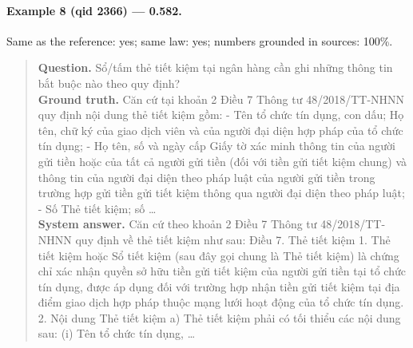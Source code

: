 \paragraph{Example 8 (qid 2366) --- \rl{} 0.582.} Same \dieu{} as the reference: yes; same law: yes; numbers grounded in sources: 100\%.
\begin{quote}\small\textbf{Question.} Sổ/tấm thẻ tiết kiệm tại ngân hàng cần ghi những thông tin bắt buộc nào theo quy định?\\[2pt]
\textbf{Ground truth.} Căn cứ tại khoản 2 Điều 7 Thông tư 48/2018/TT-NHNN quy định nội dung thẻ tiết kiệm gồm: - Tên tổ chức tín dụng, con dấu; Họ tên, chữ ký của giao dịch viên và của người đại diện hợp pháp của tổ chức tín dụng; - Họ tên, số và ngày cấp Giấy tờ xác minh thông tin của người gửi tiền hoặc của tất cả người gửi tiền (đối với tiền gửi tiết kiệm chung) và thông tin của người đại diện theo pháp luật của người gửi tiền trong trường hợp gửi tiền gửi tiết kiệm thông qua người đại diện theo pháp luật; - Số Thẻ tiết kiệm; số …\\[2pt]
\textbf{System answer.} Căn cứ theo khoản 2 Điều 7 Thông tư 48/2018/TT-NHNN quy định về thẻ tiết kiệm như sau: Điều 7. Thẻ tiết kiệm 1. Thẻ tiết kiệm hoặc Sổ tiết kiệm (sau đây gọi chung là Thẻ tiết kiệm) là chứng chỉ xác nhận quyền sở hữu tiền gửi tiết kiệm của người gửi tiền tại tổ chức tín dụng, được áp dụng đối với trường hợp nhận tiền gửi tiết kiệm tại địa điểm giao dịch hợp pháp thuộc mạng lưới hoạt động của tổ chức tín dụng. 2. Nội dung Thẻ tiết kiệm a) Thẻ tiết kiệm phải có tối thiểu các nội dung sau: (i) Tên tổ chức tín dụng, …\end{quote}

